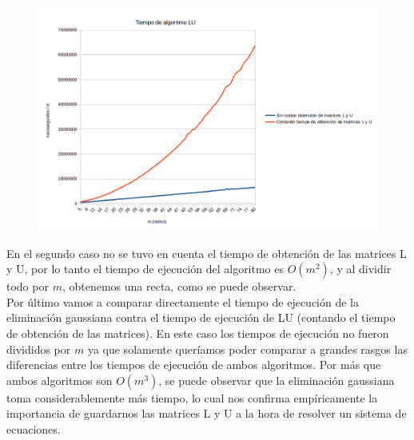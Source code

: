 \begin{figure}[h]
  \center
  \includegraphics[scale=0.6]{imagenes/tiempoLUdivididoM.png}
  \label{fig:ludivididom}
\end{figure}


En el segundo caso no se tuvo en cuenta el tiempo de obtención de las matrices L y U, por lo tanto el tiempo de ejecución del algoritmo es $O(m^{2})$, y al dividir todo por $m$, obtenemos una recta, como se puede observar. \\


Por último vamos a comparar directamente el tiempo de ejecución de la eliminación gaussiana contra el tiempo de ejecución de LU (contando el tiempo de obtención de las matrices). En este caso los tiempos de ejecución no fueron divididos por $m$ ya que solamente queríamos poder comparar a grandes rasgos las diferencias entre los tiempos de ejecución de ambos algoritmos. Por más que ambos algoritmos son $O(m^{3})$, se puede observar que la eliminación gaussiana toma considerablemente más tiempo, lo cual nos confirma empíricamente la importancia de guardarnos las matrices L y U a la hora de resolver un sistema de ecuaciones.

\newpage

